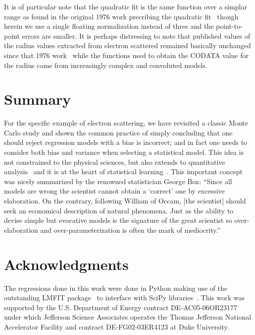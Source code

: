 \documentclass[10pt,aps,prc,twocolumn]{revtex4-1}
\begin{document}
It is of particular note that the quadratic fit is the same function over a simplar range as found in the original 1976 work precribing
the quadratic fit~\cite{Borkowski:1975} though herein we use a single floating normalization 
instead of three and the point-to-point errors are smaller.   It is perhaps distressing to note that published values of the 
radius values extracted from electron scattered remained basically unchanged since that 1976 work~\cite{Borkowski:1975} while the 
functions used to obtain the CODATA value for the radius came from increasingly complex and convoluted models.   


\section{Summary}

For the specific example of electron scattering, we have revisited a classic Monte Carlo study and shown
the common practice of simply concluding that one should reject regression models with a bias is incorrect; 
and in fact one needs to consider both bias and variance when selecting a statistical model.   
This idea is not constrained to the physical sciences, but also extends 
to quantitative analysis~\cite{Brighton:2015} and it is at the heart of statistical 
learning~\cite{Hastie:2009}.
This important concept was nicely summarized by the renowned statistician George Box: 
``Since all models are wrong the scientist cannot obtain a `correct' one
by excessive elaboration.  On the contrary, following William of Occam, 
[the scientist] should seek an economical description of natural phenomena. 
Just as the ability to devise simple but evocative models is the signature of the
great scientist so over-elaboration and over-parameterization is often
the mark of mediocrity.''~\cite{Box76}


\section{Acknowledgments}

The regressions done in this work were done in Python making use of the
outstanding LMFIT package~\cite{Newville:2014} to interface with SciPy
libraries~\cite{Jones:2001}.
This work was supported by the U.S.  Department of Energy contract DE-AC05-06OR23177
under which Jefferson Science Associates operates the Thomas Jefferson National 
Accelerator Facility and contract DE-FG02-03ER4123 at Duke University.


\end{document}
